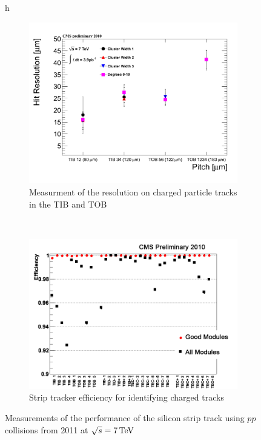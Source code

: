 \begin{figure}{h}
    \centering
    \begin{subfigure}[h]{0.450\textwidth}
        \includegraphics[width=\textwidth]{Figures/CMS_Diagrams/Tracker__Strip_HitRes.pdf}
        \caption{Measurment of the resolution on charged particle
          tracks in the TIB and TOB}\label{fig:tracker_strip_hitRes}
      \end{subfigure}
      ~ %
    \begin{subfigure}[h]{0.450\textwidth}
        \includegraphics[width=\textwidth]{Figures/CMS_Diagrams/Tracker__Strip_efficiency_end2010.png}
        \caption{Strip tracker efficiency for identifying charged tracks}\label{fig:tracker_strip_efficiency}
      \end{subfigure}
      \caption{Measurements of the performance of the silicon strip
        track using $pp$ collisions from 2011 at $\sqrt{s}=7 \,\text{Te\hspace{-.08em}V}$}\label{fig:tracker_strip_performance}
\end{figure}

